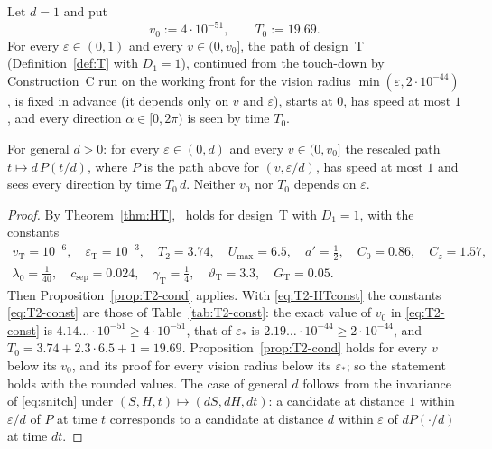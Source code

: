 \begin{theorem}\label{thm:Main}
Let $d=1$ and put
\[
v_0:=4\cdot10^{-51},\qquad T_0:=19.69 .
\]
For every $\varepsilon\in(0,1)$ and every $v\in(0,v_0]$, the path of design~T (Definition~\ref{def:T} with $D_1=1$), continued from the
touch-down by Construction~C run on the working front for the vision radius $\min(\varepsilon,2\cdot10^{-44})$, is fixed in
advance (it depends only on $v$ and $\varepsilon$), starts at $0$, has speed at most $1$, and every direction
$\alpha\in[0,2\pi)$ is seen by time $T_0$.

For general $d>0$: for every $\varepsilon\in(0,d)$ and every $v\in(0,v_0]$ the rescaled path $t\mapsto d\,P(t/d)$, where $P$ is
the path above for $(v,\varepsilon/d)$, has speed at most $1$ and sees every direction by time $T_0\,d$. Neither $v_0$ nor $T_0$
depends on $\varepsilon$.
\end{theorem}
\begin{proof}
By Theorem~\ref{thm:HT}, \MHT\ holds for design~T with $D_1=1$, with the constants
\begin{equation}\label{eq:T2-HTconst}
\begin{gathered}
v_{\mathrm T}=10^{-6},\quad\varepsilon_{\mathrm T}=10^{-3},\quad T_2=3.74,\quad U_{\max}=6.5,\quad a'=\tfrac12,\quad C_0=0.86,\quad C_z=1.57,\\
\lambda_0=\tfrac1{40},\quad c_{\mathrm{sep}}=0.024,\quad\gamma_{\mathrm T}=\tfrac14,\quad\vartheta_{\mathrm T}=3.3,\quad G_{\mathrm T}=0.05 .
\end{gathered}
\end{equation}
Then Proposition~\ref{prop:T2-cond} applies. With \eqref{eq:T2-HTconst} the constants \eqref{eq:T2-const} are those of
Table~\ref{tab:T2-const}: the exact value of $v_0$ in \eqref{eq:T2-const} is $4.14\ldots\cdot10^{-51}\ge4\cdot10^{-51}$, that of
$\varepsilon_*$ is $2.19\ldots\cdot10^{-44}\ge2\cdot10^{-44}$, and $T_0=3.74+2.3\cdot6.5+1=19.69$. Proposition~\ref{prop:T2-cond}
holds for every $v$ below its $v_0$, and its proof for every vision radius below its $\varepsilon_*$; so the statement holds with
the rounded values. The case of general $d$ follows from the invariance of \eqref{eq:snitch} under
$(S,H,t)\mapsto(dS,dH,dt)$: a candidate at distance $1$ within $\varepsilon/d$ of $P$ at time $t$ corresponds to a candidate at
distance $d$ within $\varepsilon$ of $dP(\cdot/d)$ at time $dt$.
\end{proof}

